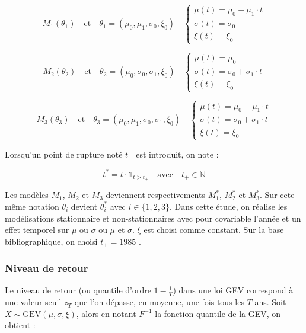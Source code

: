 \documentclass[
  article,
  nofooter,
  noheadings]{jss}
\begin{document}
\[
M_1(\theta_1) \quad \text{et} \quad \theta_1 = (\mu_0, \mu_1, \sigma_0, \xi_0) \quad
\begin{cases}
\mu(t) = \mu_0 + \mu_1 \cdot t \\
\sigma(t) = \sigma_0 \\
\xi(t) = \xi_0
\end{cases}
\]

\[
M_2(\theta_2) \quad \text{et} \quad \theta_2 = (\mu_0, \sigma_0, \sigma_1, \xi_0)
\quad
\begin{cases}
\mu(t) = \mu_0 \\
\sigma(t) = \sigma_0 + \sigma_1 \cdot t \\
\xi(t) = \xi_0
\end{cases}
\]

\[
M_3(\theta_3) \quad \text{et} \quad \theta_3 = (\mu_0, \mu_1, \sigma_0, \sigma_1, \xi_0)
\quad
\begin{cases}
\mu(t) = \mu_0 + \mu_1 \cdot t\\
\sigma(t) = \sigma_0 + \sigma_1 \cdot t \\
\xi(t) = \xi_0
\end{cases}
\]

Lorsqu'un point de rupture noté \(t_+\) est introduit, on note :

\[
t^\ast = t \cdot \mathbb{1}_{t > t_+} \quad \text{avec} \quad t_+ \in \mathbb{N}
\]

Les modèles \(M_1\), \(M_2\) et \(M_3\) deviennent respectivements
\(M_1^\ast\), \(M_2^\ast\) et \(M_3^\ast\). Sur cete même notation
\(\theta_i\) devient \(\theta^\ast_i\) avec \(i \in \{1, 2, 3\}\). Dans
cette étude, on réalise les modélisations stationnaire et
non-stationnaires avec pour covariable l'année et un effet temporel sur
\(\mu\) ou \(\sigma\) ou \(\mu\) et \(\sigma\). \(\xi\) est choisi comme
constant. Sur la base bibliographique, on choisi \(t_+ = 1985\)
\citep{blanchet2022instrumental}.

\subsubsection{Niveau de retour}\label{niveau-de-retour}

Le niveau de retour (ou quantile d'ordre \(1 - \tfrac{1}{T}\)) dans une
loi GEV correspond à une valeur seuil \(z_T\) que l'on dépasse, en
moyenne, une fois tous les \(T\) ans. Soit
\(X \sim \mathrm{GEV}(\mu, \sigma, \xi)\), alors en notant \(F^{-1}\) la
fonction quantile de la GEV, on obtient :
\end{document}
